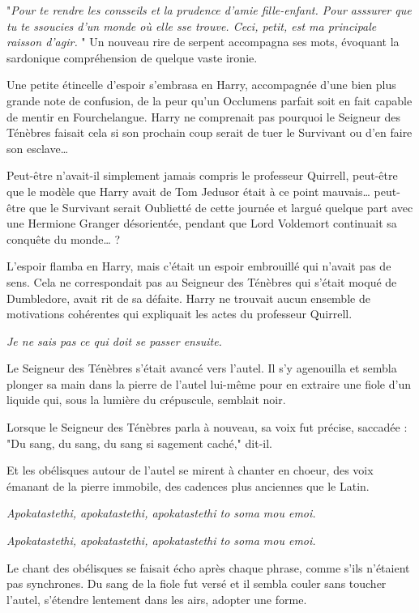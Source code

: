 "\emph{Pour te rendre les consseils et la prudence d'amie fille-enfant. Pour asssurer que tu te ssoucies d'un monde où elle sse trouve. Ceci, petit, est ma principale raisson d'agir.} " Un nouveau rire de serpent accompagna ses mots, évoquant la sardonique compréhension de quelque vaste ironie.

Une petite étincelle d'espoir s'embrasa en Harry, accompagnée d'une bien plus grande note de confusion, de la peur qu'un Occlumens parfait soit en fait capable de mentir en Fourchelangue. Harry ne comprenait pas pourquoi le Seigneur des Ténèbres faisait cela si son prochain coup serait de tuer le Survivant ou d'en faire son esclave…

Peut-être n'avait-il simplement jamais compris le professeur Quirrell, peut-être que le modèle que Harry avait de Tom Jedusor était à ce point mauvais… peut-être que le Survivant serait Oublietté de cette journée et largué quelque part avec une Hermione Granger désorientée, pendant que Lord Voldemort continuait sa conquête du monde… ?

L'espoir flamba en Harry, mais c'était un espoir embrouillé qui n'avait pas de sens. Cela ne correspondait pas au Seigneur des Ténèbres qui s'était moqué de Dumbledore, avait rit de sa défaite. Harry ne trouvait aucun ensemble de motivations cohérentes qui expliquait les actes du professeur Quirrell.

\emph{Je ne sais pas ce qui doit se passer ensuite.} 

Le Seigneur des Ténèbres s'était avancé vers l'autel. Il s'y agenouilla et sembla plonger sa main dans la pierre de l'autel lui-même pour en extraire une fiole d'un liquide qui, sous la lumière du crépuscule, semblait noir.

Lorsque le Seigneur des Ténèbres parla à nouveau, sa voix fut précise, saccadée : "Du sang, du sang, du sang si sagement caché," dit-il.

Et les obélisques autour de l'autel se mirent à chanter en choeur, des voix émanant de la pierre immobile, des cadences plus anciennes que le Latin.

\emph{Apokatastethi, apokatastethi, apokatastethi to soma mou emoi.} 

\emph{Apokatastethi, apokatastethi, apokatastethi to soma mou emoi.} 

Le chant des obélisques se faisait écho après chaque phrase, comme s'ils n'étaient pas synchrones. Du sang de la fiole fut versé et il sembla couler sans toucher l'autel, s'étendre lentement dans les airs, adopter une forme.

